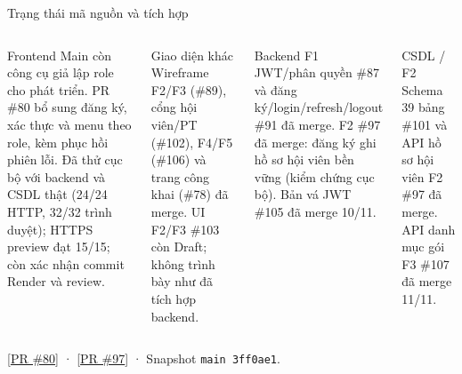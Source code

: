 \documentclass[aspectratio=169,10pt]{beamer}
\begin{document}
\begin{frame}{Trạng thái mã nguồn và tích hợp}
\small
\begin{columns}[T,onlytextwidth]
      \begin{block}{Frontend}
        Main còn công cụ giả lập role cho phát triển. PR \#80 bổ sung đăng ký, xác thực và menu theo role, kèm phục hồi phiên lỗi. Đã thử cục bộ với backend và CSDL thật (24/24 HTTP, 32/32 trình duyệt); HTTPS preview đạt 15/15; còn xác nhận commit Render và review.
      \end{block}
      \begin{block}{Giao diện khác}
        Wireframe F2/F3 (\#89), cổng hội viên/PT (\#102), F4/F5 (\#106) và trang công khai (\#78) đã merge. UI F2/F3 \#103 còn Draft; không trình bày như đã tích hợp backend.
      \end{block}
      \begin{block}{Backend F1}
        JWT/phân quyền \#87 và đăng ký/login/refresh/logout \#91 đã merge. F2 \#97 đã merge: đăng ký ghi hồ sơ hội viên bền vững (kiểm chứng cục bộ). Bản vá JWT \#105 đã merge 10/11.
      \end{block}
      \begin{block}{CSDL / F2}
        Schema 39 bảng \#101 và API hồ sơ hội viên F2 \#97 đã merge. API danh mục gói F3 \#107 đã merge 11/11.
      \end{block}
  \end{columns}
  \scriptsize [\href{https://github.com/Ktin06/it3180_nhom6_gym_management/pull/80}{PR \#80}] · [\href{https://github.com/Ktin06/it3180_nhom6_gym_management/pull/97}{PR \#97}] · Snapshot \texttt{main 3ff0ae1}.
\end{frame}
\end{document}
